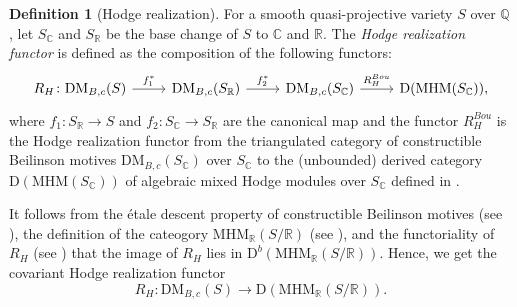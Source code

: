 \documentclass[11pt, a4paper]{amsart}
\theoremstyle{plain}
\theoremstyle{definition}
\newtheorem{definition}[theorem]{Definition}
\numberwithin{equation}{section}
\def\CC{\mathbb{C}}
\def\QQ{\mathbb{Q}}
\def\RR{\mathbb{R}}
\begin{document}
 \begin{definition}[Hodge realization]
     \label{def: Hodge realization}
      For a smooth quasi-projective variety $S$ over $\QQ$, let $S_{\CC}$ and $S_{\RR}$ be the base change of $S$ to $\CC$ and $\RR$. The \textit{Hodge realization functor} is defined as the composition of the following functors: 
      \[
            \begin{tikzcd}
                R_{H} \colon \mathrm{DM}_{B,c}(S) \ar[r, "f_{1}^{*}"] &  \mathrm{DM}_{B,c}(S_{\RR}) \ar[r, "f_{2}^{*}"] & \mathrm{DM}_{B,c}(S_{\CC}) \ar[r, "R_{H}^{Bou}"] & \mathrm{D}(\mathrm{MHM}(S_{\CC})), 
            \end{tikzcd}
      \]
      where $f_{1} \colon S_{\RR} \rightarrow S$ and $f_{2} \colon S_{\CC} \rightarrow S_{\RR}$ are the canonical map and the functor $R_{H}^{Bou}$ is the Hodge realization functor from the triangulated category of constructible Beilinson motives $\mathrm{DM}_{B,c}(S_{\CC})$ over $S_{\CC}$ to the (unbounded) derived category $\mathrm{D}(\mathrm{MHM}(S_{\CC}))$ of algebraic mixed Hodge modules over $S_{\CC}$ defined in \cite[Definition 169, Theorem 43]{Bouli22}.
      \par It follows from the \'{e}tale descent property of constructible Beilinson motives (see \cite[Theorem 14.3.4]{Cisinski_Deglise}), the definition of the cateogory $\mathrm{MHM}_{\RR}(S/\RR)$ (see \cite[Definition A.2.4]{HW98}), and the functoriality of $R_{H}$ (see \cite[Theorem 43 (ii0)]{Bouli22}) that the image of $R_{H}$ lies in $\mathrm{D}^{b}(\mathrm{MHM}_{\RR}(S/\RR))$. Hence, we get the covariant Hodge realization functor 
      \begin{equation*}
          R_{H} \colon \mathrm{DM}_{B,c}(S) \rightarrow \mathrm{D}(\mathrm{MHM}_{\RR}(S/\RR)). 
      \end{equation*}
 \end{definition}
\end{document}
